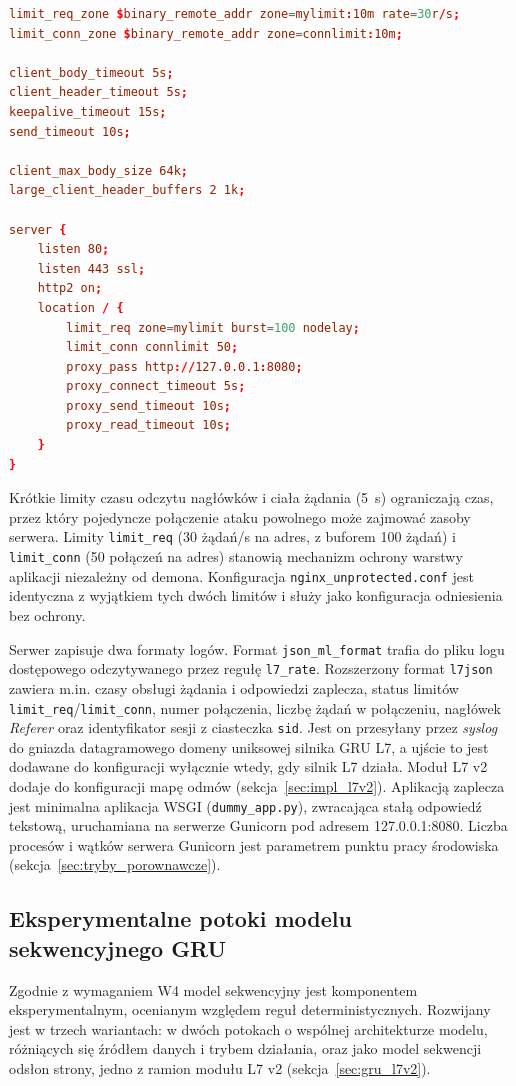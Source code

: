 \documentclass[a4paper,12pt]{article}
\begin{document}
\begin{lstlisting}[language=conf, caption={Limity czasu, rozmiarów i częstotliwości w konfiguracji Nginx (\texttt{nginx.conf}, fragment)}, label=lst:nginx]
limit_req_zone $binary_remote_addr zone=mylimit:10m rate=30r/s;
limit_conn_zone $binary_remote_addr zone=connlimit:10m;

client_body_timeout 5s;
client_header_timeout 5s;
keepalive_timeout 15s;
send_timeout 10s;

client_max_body_size 64k;
large_client_header_buffers 2 1k;

server {
    listen 80;
    listen 443 ssl;
    http2 on;
    location / {
        limit_req zone=mylimit burst=100 nodelay;
        limit_conn connlimit 50;
        proxy_pass http://127.0.0.1:8080;
        proxy_connect_timeout 5s;
        proxy_send_timeout 10s;
        proxy_read_timeout 10s;
    }
}
\end{lstlisting}

Krótkie limity czasu odczytu nagłówków i ciała żądania (5~s) ograniczają czas, przez który pojedyncze połączenie ataku powolnego może zajmować zasoby serwera. Limity \texttt{limit\_req} (30 żądań/s na adres, z buforem 100 żądań) i \texttt{limit\_conn} (50 połączeń na adres) stanowią mechanizm ochrony warstwy aplikacji niezależny od demona. Konfiguracja \texttt{nginx\_unprotected.conf} jest identyczna z wyjątkiem tych dwóch limitów i służy jako konfiguracja odniesienia bez ochrony.

Serwer zapisuje dwa formaty logów. Format \texttt{json\_ml\_format} trafia do pliku logu dostępowego odczytywanego przez regułę \texttt{l7\_rate}. Rozszerzony format \texttt{l7json} zawiera m.in. czasy obsługi żądania i odpowiedzi zaplecza, status limitów \texttt{limit\_req}/\texttt{limit\_conn}, numer połączenia, liczbę żądań w połączeniu, nagłówek \textit{Referer} oraz identyfikator sesji z ciasteczka \texttt{sid}. Jest on przesyłany przez \textit{syslog} do gniazda datagramowego domeny uniksowej silnika GRU L7, a ujście to jest dodawane do konfiguracji wyłącznie wtedy, gdy silnik L7 działa. Moduł L7 v2 dodaje do konfiguracji mapę odmów (sekcja~\ref{sec:impl_l7v2}). Aplikacją zaplecza jest minimalna aplikacja WSGI (\texttt{dummy\_app.py}), zwracająca stałą odpowiedź tekstową, uruchamiana na serwerze Gunicorn pod adresem 127.0.0.1:8080. Liczba procesów i wątków serwera Gunicorn jest parametrem punktu pracy środowiska (sekcja~\ref{sec:tryby_porownawcze}).

\subsection{Eksperymentalne potoki modelu sekwencyjnego GRU}\label{sec:impl_gru}
Zgodnie z wymaganiem W4 model sekwencyjny jest komponentem eksperymentalnym, ocenianym względem reguł deterministycznych. Rozwijany jest w trzech wariantach: w dwóch potokach o wspólnej architekturze modelu, różniących się źródłem danych i trybem działania, oraz jako model sekwencji odsłon strony, jedno z ramion modułu L7 v2 (sekcja~\ref{sec:gru_l7v2}).
\end{document}
